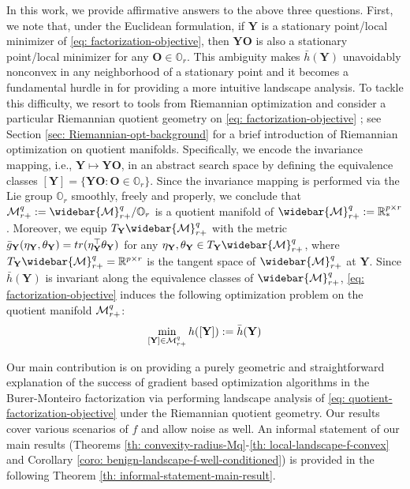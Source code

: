 \documentclass[11pt]{article}
\newcommand{\bbR}{\mathbb{R}}
\newcommand{\0}{{\mathbf{0}}}
\newcommand{\1}{{\mathbf{1}}}
\renewcommand{\O}{{\mathbf{O}}}
\newcommand{\Y}{{\mathbf{Y}}}
\newcommand{\cM}{{\cal M}}
\newcommand{\tr}{{\rm tr}}
\newcommand{\bbO}{\mathbb{O}}
\begin{document}
In this work, we provide affirmative answers to the above three questions. First, we note that, under the Euclidean formulation, if $\Y$ is a stationary point/local minimizer of \eqref{eq: factorization-objective}, then $\Y\O$ is also a stationary point/local minimizer for any $\O \in \bbO_r$. This ambiguity makes $\bar{h}(\Y)$ unavoidably nonconvex in any neighborhood of a stationary point \cite[Proposition 2]{li2016symmetry} and it becomes a fundamental hurdle in \cite{li2016symmetry,zhu2017global} for providing a more intuitive landscape analysis. To tackle this difficulty, we resort to tools from Riemannian optimization \cite{absil2009optimization,boumal2020introduction} and consider a particular Riemannian quotient geometry on \eqref{eq: factorization-objective} \cite{journee2010low}; see Section \ref{sec: Riemannian-opt-background} for a brief introduction of Riemannian optimization on quotient manifolds. Specifically, we encode the invariance mapping, i.e., $\Y \mapsto \Y \O$, in an abstract search space by defining the equivalence classes $[\Y] = \{ \Y \O: \O \in \bbO_r \}$. Since the invariance mapping is performed via the Lie group $\bbO_r$ smoothly, freely and properly, we conclude that $\cM_{r+}^{q} := \widebar{\cM}_{r+}^{q}/\bbO_r$ is a quotient manifold of $\widebar{\cM}_{r+}^{q}:=\bbR^{p \times r}_*$ \cite[Theorem 21.10]{lee2013smooth}. Moreover, we equip $T_\Y \widebar{\cM}_{r+}^{q}$ with the metric $\bar{g}_\Y(\eta_\Y, \theta_\Y)= \tr( \eta_\Y^\top \theta_\Y)$ for any $\eta_\Y, \theta_\Y \in T_\Y \widebar{\cM}_{r+}^{q}$, where $T_\Y \widebar{\cM}_{r+}^{q} = \bbR^{p \times r}$ is the tangent space of $\widebar{\cM}_{r+}^{q}$ at $\Y$. Since $\bar{h}(\Y)$ is invariant along the equivalence classes of $\widebar{\cM}_{r+}^{q}$, \eqref{eq: factorization-objective} induces the following optimization problem on the quotient manifold $\cM_{r+}^q$:
\begin{equation} \label{eq: quotient-factorization-objective}
	\min_{[\Y] \in \cM_{r+}^q } h ([\Y]):= \bar{h}(\Y)
\end{equation} 


Our main contribution is on providing a purely geometric and straightforward explanation of the success of gradient based optimization algorithms in the Burer-Monteiro factorization via performing landscape analysis of \eqref{eq: quotient-factorization-objective} under the Riemannian quotient geometry. Our results cover various scenarios of $f$ and allow noise as well. An informal statement of our main results (Theorems \ref{th: convexity-radius-Mq}-\ref{th: local-landscape-f-convex} and Corollary \ref{coro: benign-landscape-f-well-conditioned}) is provided in the following Theorem \ref{th: informal-statement-main-result}.
\end{document}
